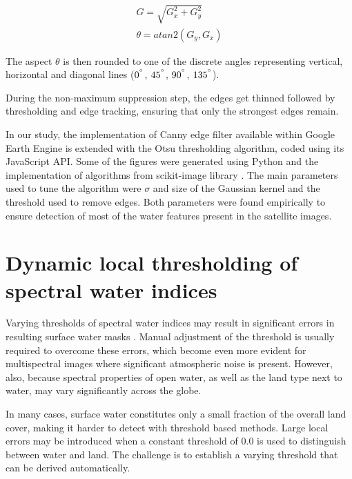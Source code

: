 \begin{gather}
G = \sqrt{G_x^2 + G_y^2} \\
\theta = atan2\left(G_y, G_x\right)
\end{gather}

The aspect $\theta$ is then rounded to one of the discrete angles representing vertical, horizontal and diagonal lines ($0^{\degree}$, $45^{\degree}$, $90^{\degree}$, $135^{\degree}$).

During the non-maximum suppression step, the edges get thinned followed by thresholding and edge tracking, ensuring that only the strongest edges remain.

In our study, the implementation of Canny edge filter available within Google Earth Engine is extended with the Otsu thresholding algorithm, coded using its JavaScript API. Some of the figures were generated using Python and the implementation of algorithms from scikit-image library \citep{webScikitImage}. The main parameters used to tune the algorithm were $\sigma$ and size of the Gaussian kernel and the threshold used to remove edges. Both parameters were found empirically to ensure detection of most of the water features present in the satellite images.

\section{Dynamic local thresholding of spectral water indices}


Varying thresholds of spectral water indices may result in significant errors in resulting surface water masks \citep{Yang2014}. Manual adjustment of the threshold is usually required to overcome these errors, which become even more evident for multispectral images where significant atmospheric noise is present. However, also, because spectral properties of open water, as well as the land type next to water, may vary significantly across the globe. 

In many cases, surface water constitutes only a small fraction of the overall land cover, making it harder to detect with threshold based methods. Large local errors may be introduced when a constant threshold of 0.0 is used to distinguish between water and land. The challenge is to establish a varying threshold that can be derived automatically. 

